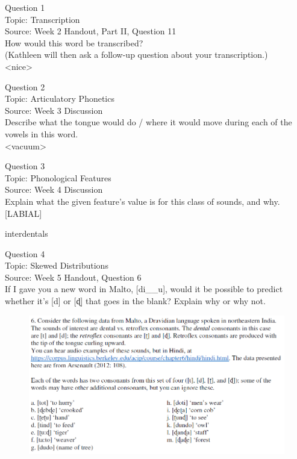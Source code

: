 \documentclass[12pt]{article}
\begin{document}
{\large Question 1}\\

Topic: Transcription\\
Source: Week 2 Handout, Part II, Question 11\\

How would this word be transcribed?\\ (Kathleen will then ask a follow-up question about your transcription.)\\

<nice>


\newpage

{\large Question 2}\\

Topic: Articulatory Phonetics\\
Source: Week 3 Discussion\\

Describe what the tongue would do / where it would move during each of the vowels in this word.\\

<vacuum>


\newpage

{\large Question 3}\\

Topic: Phonological Features\\
Source: Week 4 Discussion\\

Explain what the given feature’s value is for this class of sounds, and why.\\

{[LABIAL]}

interdentals


\newpage

{\large Question 4}\\

Topic: Skewed Distributions\\
Source: Week 5 Handout, Question 6\\

If I gave you a new word in Malto, [di\_\_u], would it be possible to predict whether it's [d] or [ɖ] that goes in the blank? Explain why or why not.\\

\begin{figure}[H]
\includegraphics{../images/malto.png}
\end{figure}
\end{document}
